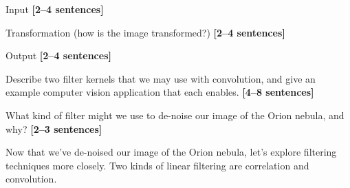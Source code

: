 \documentclass{csci1430}
\begin{document}
\begin{subsubquestion}[points=2]
Input \textbf{[2--4 sentences]}
\end{subsubquestion}

\begin{answer}[height=7]

\end{answer}

\begin{subsubquestion}[points=2]
    Transformation (how is the image transformed?) \textbf{[2--4 sentences]}
\end{subsubquestion}

\begin{answer}[height=9]

\end{answer}

\pagebreak    
\begin{subsubquestion}[points=2]
    Output \textbf{[2--4 sentences]}
\end{subsubquestion}

\begin{answer}[height=7]

\end{answer}


\begin{subquestion}[points=4]
Describe two filter kernels that we may use with convolution, and give an example computer vision application that each enables. \textbf{[4--8 sentences]}
\end{subquestion}

\begin{answer}[height=14]

\end{answer}

\begin{subquestion}[points=2]
What kind of filter might we use to de-noise our image of the Orion nebula, and why? \textbf{[2--3 sentences]}
\end{subquestion}

\begin{answer}[height=7]

\end{answer}

\pagebreak

\begin{question}[points=8,drawbox=false]
Now that we've de-noised our image of the Orion nebula, let's explore filtering techniques more closely. Two kinds of linear filtering are correlation and convolution.
\end{question}
\end{document}
